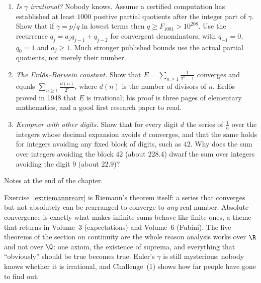 \begin{challenge}
\begin{enumerate}[label=(\arabic*)]
\item \emph{Is $\gamma$ irrational?} Nobody knows. Assume a certified computation has established at least $1000$ positive partial quotients after the integer part of $\gamma$. Show that if $\gamma=p/q$ in lowest terms then $q\ge F_{1001}>10^{208}$. Use the recurrence $q_j=a_jq_{j-1}+q_{j-2}$ for convergent denominators, with $q_{-1}=0$, $q_0=1$ and $a_j\ge1$. Much stronger published bounds use the actual partial quotients, not merely their number.
\item \emph{The Erd\H{o}s--Borwein constant.} Show that $E=\sum_{n\ge1}\frac1{2^n-1}$ converges and equals $\sum_{n\ge1}\frac{d(n)}{2^n}$, where $d(n)$ is the number of divisors of $n$. Erd\H{o}s proved in 1948 that $E$ is irrational; his proof is three pages of elementary mathematics, and a good first research paper to read.
\item \emph{Kempner with other digits.} Show that for every digit $d$ the series of $\frac1n$ over the integers whose decimal expansion avoids $d$ converges, and that the same holds for integers avoiding any fixed block of digits, such as $42$. Why does the sum over integers avoiding the block $42$ (about $228.4$) dwarf the sum over integers avoiding the digit $9$ (about $22.9$)?
\end{enumerate}
Notes at the end of the chapter.
\end{challenge}

\begin{beauty}
Exercise~\ref{ex:riemannrearr} is Riemann's theorem itself: a series that converges but not absolutely can be rearranged to converge to
\emph{any} real number. Absolute convergence is exactly what makes infinite sums behave like finite ones, a theme that returns in Volume~3
(expectations) and Volume~6 (Fubini). The five theorems of the section on continuity are the whole reason analysis works over $\R$ and not over $\Q$: one
axiom, the existence of suprema, and everything that ``obviously'' should be true becomes true. Euler's $\gamma$ is still mysterious: nobody knows
whether it is irrational, and Challenge~(1) shows how far people have gone to find out.
\end{beauty}


